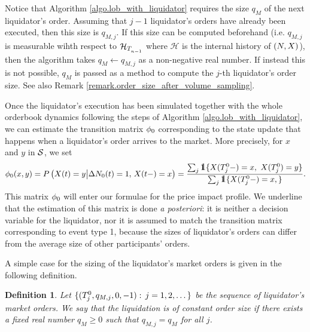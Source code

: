 \documentclass[10pt, article,table]{article}
\newtheorem{defi}[thm]{Definition}
\begin{document}
\begin{remark}
 Notice that Algorithm \ref{algo.lob_with_liquidator} requires the size $q_M$ of the next liquidator's order. Assuming that $j-1$ liquidator's orders have already been executed, then this size is $q_{M,j}$. If this size can be computed beforehand (i.e. $q_{M,j}$ is measurable wihth respect to $\mathcal{H}_{\arrivalTimes[]_{n-1}}$ where $\mathcal{H}$ is the internal history of $(\multiCountingProc,\stateVariable)$), then the algorithm takes  $q_M \leftarrow q_{M,j}$ as a non-negative real number. If instead this is not possible, $q_M$ is passed as a method to compute the $j$-th liquidator's order size. See also Remark \ref{remark.order_size_after_volume_sampling}. 
\end{remark}

Once the liquidator's execution has been simulated together with the whole orderbook dynamics following the steps of Algorithm \ref{algo.lob_with_liquidator}, we can estimate the transition matrix $\transProb_{0}$ corresponding to the  state update that happens when a liquidator's order arrives to the market. More precisely, for $x$ and $y$ in $\stateSpace$, we set 
\begin{equation}\label{eq.transProb_liquidator}
  \transProb_{0}(x,y) = \Prob\left(\stateVariable(t) = y \big\vert \Delta\countingProc[0](t)=1, \, \stateVariable(t-)=x\right) = \frac{\sum_j \one\lbrace\stateVariable(\arrivalTimes[0]_j - )=x, \, \, \stateVariable(\arrivalTimes[0]_j )=y\rbrace} {\sum_j \one\lbrace\stateVariable(\arrivalTimes[0]_j - )=x, \rbrace}.
\end{equation}
This matrix $\transProb_0$ will enter our formulae for the price impact profile. We underline that the estimation of this matrix is done \emph{a posteriori}: it is neither a decision variable for the liquidator, nor it is assumed to match the transition matrix corresponding to event type 1, because the sizes of liquidator's orders can differ from the average size of other participants' orders. 

A simple case for the sizing of the liquidator's market orders is given in the following definition. 
\begin{defi}\label{def.liquidation_with_constant_size}
 Let $\lbrace (\arrivalTimes[0]_j, q_{M,j}, 0, -1): \, j=1,2,\dots\rbrace$ be the sequence of liquidator's market orders. We say that the liquidation is of constant order size if there exists a fixed real number $q_{M}\geq 0$ such that $q_{M,j} = q_{M}$ for all $j$.
\end{defi}
\end{document}
